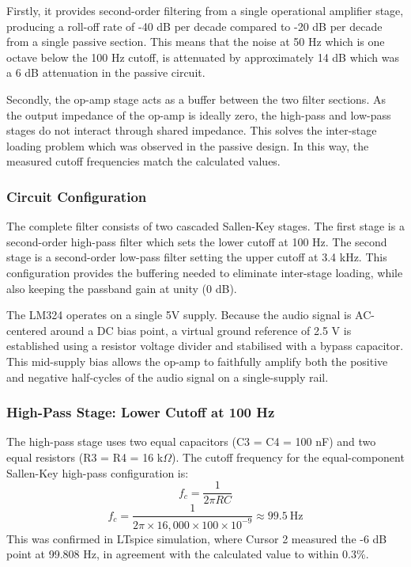 Firstly, it provides second-order filtering from a single operational amplifier stage, producing a roll-off rate of -40 dB per decade compared to -20 dB per decade from a single passive section. This means that the noise at 50 Hz which is one octave below the 100 Hz cutoff, is attenuated by approximately 14 dB which was a 6 dB attenuation in the passive circuit.

Secondly, the op-amp stage acts as a buffer between the two filter sections. As the output impedance of the op-amp is ideally zero, the high-pass and low-pass stages do not interact through shared impedance. This solves the inter-stage loading problem which was observed in the passive design. In this way, the measured cutoff frequencies match the calculated values.

\subsubsection{Circuit Configuration}

The complete filter consists of two cascaded Sallen-Key stages. The first stage is a second-order high-pass filter which sets the lower cutoff at 100 Hz. The second stage is a second-order low-pass filter setting the upper cutoff at 3.4 kHz. This configuration provides the buffering needed to eliminate inter-stage loading, while also keeping the passband gain at unity (0 dB).

The LM324 operates on a single 5V supply. Because the audio signal is AC-centered around a DC bias point, a virtual ground reference of 2.5 V is established using a resistor voltage divider and stabilised with a bypass capacitor. This mid-supply bias allows the op-amp to faithfully amplify both the positive and negative half-cycles of the audio signal on a single-supply rail.

\subsubsection{High-Pass Stage: Lower Cutoff at 100 Hz}

The high-pass stage uses two equal capacitors (C3 = C4 = 100 nF) and two equal resistors (R3 = R4 = 16 k$\Omega$). The cutoff frequency for the equal-component Sallen-Key high-pass configuration is:
\[
f_c = \frac{1}{2\pi RC}
\]
\[
f_c = \frac{1}{2\pi \times 16,\!000 \times 100 \times 10^{-9}} \approx 99.5~\text{Hz}
\]
This was confirmed in LTspice simulation, where Cursor 2 measured the -6 dB point at 99.808 Hz, in agreement with the calculated value to within 0.3\%.

